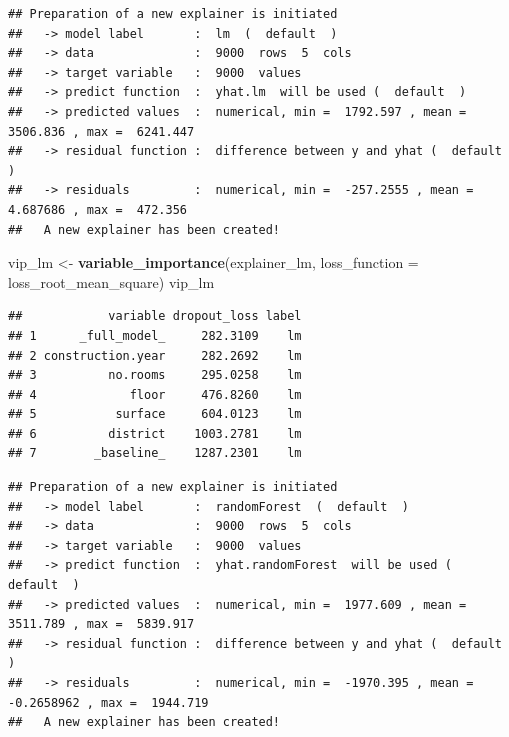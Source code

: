\documentclass[12pt,]{krantz}
\newenvironment{Shaded}{\begin{snugshade}}{\end{snugshade}}
\newcommand{\DataTypeTok}[1]{\textcolor[rgb]{0.13,0.29,0.53}{#1}}
\newcommand{\DecValTok}[1]{\textcolor[rgb]{0.00,0.00,0.81}{#1}}
\newcommand{\KeywordTok}[1]{\textcolor[rgb]{0.13,0.29,0.53}{\textbf{#1}}}
\newcommand{\NormalTok}[1]{#1}
\newcommand{\OperatorTok}[1]{\textcolor[rgb]{0.81,0.36,0.00}{\textbf{#1}}}
\newcommand{\OtherTok}[1]{\textcolor[rgb]{0.56,0.35,0.01}{#1}}
\newcommand{\StringTok}[1]{\textcolor[rgb]{0.31,0.60,0.02}{#1}}
\begin{document}
\begin{verbatim}
## Preparation of a new explainer is initiated
##   -> model label       :  lm  (  default  )
##   -> data              :  9000  rows  5  cols 
##   -> target variable   :  9000  values 
##   -> predict function  :  yhat.lm  will be used (  default  )
##   -> predicted values  :  numerical, min =  1792.597 , mean =  3506.836 , max =  6241.447  
##   -> residual function :  difference between y and yhat (  default  )
##   -> residuals         :  numerical, min =  -257.2555 , mean =  4.687686 , max =  472.356  
##   A new explainer has been created!
\end{verbatim}

\begin{Shaded}
\begin{Highlighting}[]
\NormalTok{vip_lm <-}\StringTok{ }\KeywordTok{variable_importance}\NormalTok{(explainer_lm, }
            \DataTypeTok{loss_function =}\NormalTok{ loss_root_mean_square)}
\NormalTok{vip_lm}
\end{Highlighting}
\end{Shaded}

\begin{verbatim}
##            variable dropout_loss label
## 1      _full_model_     282.3109    lm
## 2 construction.year     282.2692    lm
## 3          no.rooms     295.0258    lm
## 4             floor     476.8260    lm
## 5           surface     604.0123    lm
## 6          district    1003.2781    lm
## 7        _baseline_    1287.2301    lm
\end{verbatim}

\begin{Shaded}
\end{Shaded}

\begin{verbatim}
## Preparation of a new explainer is initiated
##   -> model label       :  randomForest  (  default  )
##   -> data              :  9000  rows  5  cols 
##   -> target variable   :  9000  values 
##   -> predict function  :  yhat.randomForest  will be used (  default  )
##   -> predicted values  :  numerical, min =  1977.609 , mean =  3511.789 , max =  5839.917  
##   -> residual function :  difference between y and yhat (  default  )
##   -> residuals         :  numerical, min =  -1970.395 , mean =  -0.2658962 , max =  1944.719  
##   A new explainer has been created!
\end{verbatim}
\end{document}
